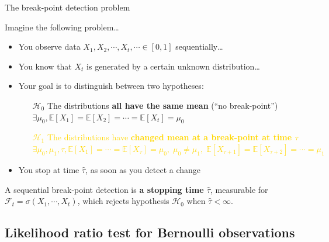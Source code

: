 \documentclass[11pt,french,ignorenonframetext,]{beamer}
\begin{document}
\begin{frame}{The break-point detection problem}

  Imagine the following problem\ldots

  \begin{itemize}
    \item You observe data $X_1,X_2,\cdots,X_t,\cdots \in[0,1]$ sequentially\ldots
    \item You know that $X_t$ is generated by a certain \alert{unknown} distribution\ldots

    \pause
    \item \alert{Your goal} is to distinguish between two hypotheses:
    \begin{itemize}
      \item[\textcolor{deeppurple}{$\mathcal{H}_0$}] \textcolor{deeppurple}{The distributions \textbf{all have the same mean} \hfill{} (``no break-point'')\\
      $\exists \mu_0, \mathbb{E}[X_1] = \mathbb{E}[X_2] = \cdots = \mathbb{E}[X_t] = \mu_0$}

      \item[\textcolor{gold}{$\mathcal{H}_1$}] \textcolor{gold}{The distributions have \textbf{changed mean at a break-point at time $\tau$} \\
      $\exists \mu_0, \mu_1, \tau, \mathbb{E}[X_1] = \cdots = \mathbb{E}[X_{\tau}] = \mu_0, \; \mu_0 \neq \mu_1, \; \mathbb{E}[X_{\tau+1}] = \mathbb{E}[X_{\tau+2}] = \cdots = \mu_1$}
    \end{itemize}
    \item You stop at time $\widehat{\tau}$, as soon as you detect a change
  \end{itemize}

  \pause
  A \alert{sequential break-point detection} is \alert{\textbf{a stopping time $\widehat{\tau}$}},
  measurable for $\mathcal{F}_t = \sigma(X_1,\cdots,X_t)$,
  which rejects hypothesis \textcolor{deeppurple}{$\mathcal{H}_0$}
  when $\widehat{\tau} < \infty$.

\end{frame}


\subsection{\hfill{}Likelihood ratio test for Bernoulli observations\hfill{}}
\end{document}
